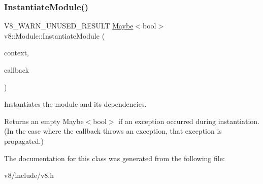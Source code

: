 \subsubsection{\texorpdfstring{Instantiate\+Module()}{InstantiateModule()}}
{\footnotesize\ttfamily V8\+\_\+\+W\+A\+R\+N\+\_\+\+U\+N\+U\+S\+E\+D\+\_\+\+R\+E\+S\+U\+LT \mbox{\hyperlink{classv8_1_1Maybe}{Maybe}}$<$bool$>$ v8\+::\+Module\+::\+Instantiate\+Module (\begin{DoxyParamCaption}\item[{\mbox{\hyperlink{classv8_1_1Local}{Local}}$<$ \mbox{\hyperlink{classv8_1_1Context}{Context}} $>$}]{context,  }\item[{Resolve\+Callback}]{callback }\end{DoxyParamCaption})}

Instantiates the module and its dependencies.

Returns an empty Maybe$<$bool$>$ if an exception occurred during instantiation. (In the case where the callback throws an exception, that exception is propagated.) 

The documentation for this class was generated from the following file\+:\begin{DoxyCompactItemize}
\item 
v8/include/v8.\+h\end{DoxyCompactItemize}
